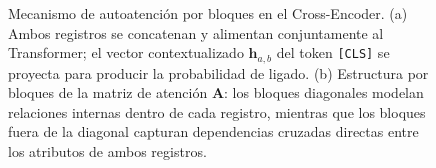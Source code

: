 \begin{figure}[htbp]
\caption{Mecanismo de autoatenci\'on por bloques en el Cross-Encoder. (a) Ambos registros se concatenan y alimentan conjuntamente al Transformer; el vector contextualizado $\mathbf{h}_{a,b}$ del token \texttt{[CLS]} se proyecta para producir la probabilidad de ligado. (b) Estructura por bloques de la matriz de atenci\'on $\mathbf{A}$: los bloques diagonales modelan relaciones internas dentro de cada registro, mientras que los bloques fuera de la diagonal capturan dependencias cruzadas directas entre los atributos de ambos registros.}
\label{fig:cross_encoder_attention_blocks}
\end{figure}
